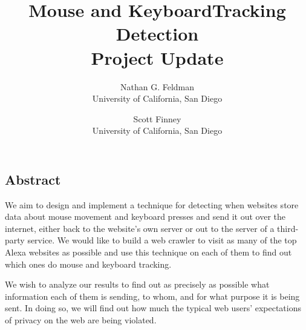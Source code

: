 \documentclass[letterpaper,twocolumn,10pt]{article}
\begin{document}
\date{}

\title{\Large \bf Mouse and KeyboardTracking Detection \\ Project Update}

\author{
{\rm Nathan G. Feldman}\\%
University of California, San Diego
\and
{\rm Scott Finney}\\
University of California, San Diego
} %

\maketitle

\thispagestyle{empty}



\subsection*{Abstract}
We aim to design and implement a technique for detecting when websites store data about mouse movement and keyboard presses and send it out over the internet, either back to the website's own server or out to the server of a third-party service.  We would like to build a web crawler to visit as many of the top Alexa websites as possible and use this technique on each of them to find out which ones do mouse and keyboard tracking.

We wish to analyze our results to find out as precisely as possible what information each of them is sending, to whom, and for what purpose it is being sent. In doing so, we will find out how much the typical web users' expectations of privacy on the web are being violated.
\end{document}
